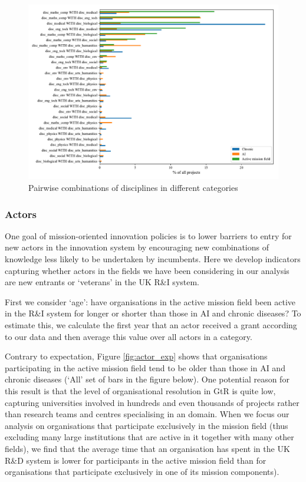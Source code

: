 \documentclass[11pt]{article}
\begin{document}
\begin{figure}[!ht]
    \centering
    \includegraphics[width=\textwidth]{figures/fig_12_disc_combs.pdf}
    \caption{Pairwise combinations of disciplines in different categories}
    \label{fig:disc_pairs}
\end{figure}

\subsubsection{Actors}
One goal of mission-oriented innovation policies is to lower barriers to entry for new actors in the innovation system by encouraging new combinations of knowledge less likely to be undertaken by incumbents. Here we develop indicators capturing whether actors in the fields we have been considering in our analysis are new entrants or `veterans' in the UK R\&I system.

First we consider `age’: have organisations in the active mission field been active in the R\&I system for longer or shorter than those in AI and chronic diseases? To estimate this, we calculate the first year that an actor received a grant according to our data and then average this value over all actors in a category. 

Contrary to expectation, Figure \ref{fig:actor_exp} shows that organisations participating in the active mission field tend to be older than those in AI and chronic diseases (‘All’ set of bars in the
figure below). One potential reason for this result is that the level of organisational resolution in GtR is quite low, capturing universities involved in hundreds and even thousands of projects rather than research teams and centres specialising in an domain.  When we focus our analysis on organisations that participate exclusively in the mission field (thus excluding many large institutions that are active in it together with many other fields), we find that the average time that an organisation has spent in the UK R\&D system is lower for participants in the active mission field than for organisations that participate exclusively in one of its mission components).
\end{document}
